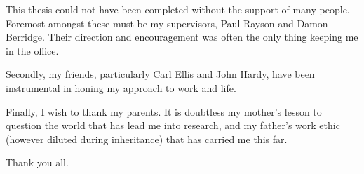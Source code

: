 
This thesis could not have been completed without the support of many people.  Foremost  amongst these must be my supervisors, Paul Rayson and Damon Berridge.  Their direction and encouragement was often the only thing keeping me in the office.

Secondly, my friends, particularly Carl Ellis and John Hardy, have been instrumental in honing my approach to work and life.%

Finally, I wish to thank my parents.  It is doubtless my mother's lesson to question the world that has lead me into research, and my father's work ethic (however diluted during inheritance) that has carried me this far.

\begin{center}
Thank you all.
\end{center}



